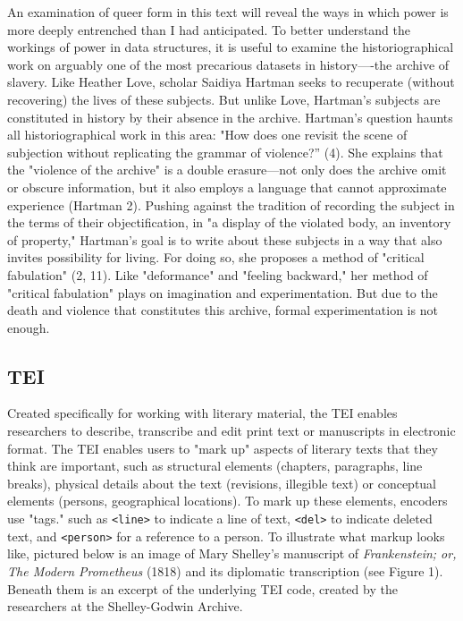 \documentclass[11pt]{article}
\begin{document}
An examination of queer form in this text will reveal the ways in
which power is more deeply entrenched than I had anticipated. To
better understand the workings of power in data structures, it is
useful to examine the historiographical work on arguably one of the
most precarious datasets in history—-the archive of slavery. Like
Heather Love, scholar Saidiya Hartman seeks to recuperate (without
recovering) the lives of these subjects. But unlike Love, Hartman's
subjects are constituted in history by their absence in the
archive. Hartman's question haunts all historiographical work in this
area: "How does one revisit the scene of subjection without
replicating the grammar of violence?” (4). She explains that the
"violence of the archive" is a double erasure---not only does the
archive omit or obscure information, but it also employs a language
that cannot approximate experience (Hartman 2). Pushing against the
tradition of recording the subject in the terms of their
objectification, in "a display of the violated body, an inventory of
property," Hartman's goal is to write about these subjects in a way
that also invites possibility for living. For doing so, she proposes a
method of "critical fabulation" (2, 11). Like "deformance" and
"feeling backward," her method of "critical fabulation" plays on
imagination and experimentation. But due to the death and violence
that constitutes this archive, formal experimentation is not enough.

\subsection{TEI}
\label{sec:orgbebc830}
Created specifically for working with literary material, the TEI
enables researchers to describe, transcribe and edit print text or
manuscripts in electronic format. The TEI enables users to "mark up"
aspects of literary texts that they think are important, such as
structural elements (chapters, paragraphs, line breaks), physical
details about the text (revisions, illegible text) or conceptual
elements (persons, geographical locations). To mark up these elements,
encoders use "tags." such as \texttt{<line>} to indicate a line of text,
\texttt{<del>} to indicate deleted text, and \texttt{<person>} for a reference to a
person. To illustrate what markup looks like, pictured below is an
image of Mary Shelley's manuscript of \emph{Frankenstein; or, The Modern
Prometheus} (1818) and its diplomatic transcription (see Figure
1). Beneath them is an excerpt of the underlying TEI code, created by
the researchers at the Shelley-Godwin Archive.
\end{document}
